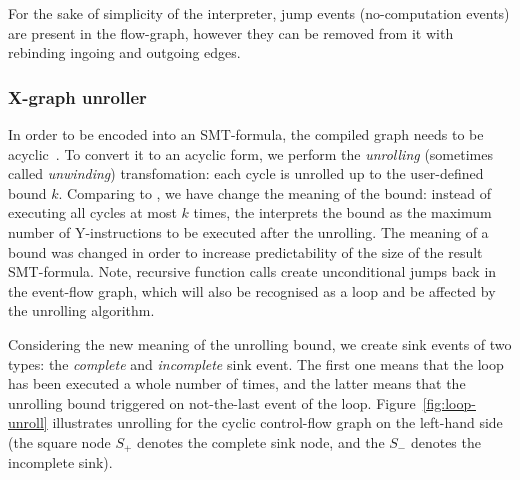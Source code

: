 
For the sake of simplicity of the interpreter, jump events (no-computation events) are present in the flow-graph, however they can be removed from it with rebinding ingoing and outgoing edges.




\subsubsection{X-graph unroller}
\label{ch:impl:proc:x-unroll}

In order to be encoded into an SMT-formula, the compiled graph needs to be acyclic~\cite{Porthos17b}.
To convert it to an acyclic form, we perform the \textit{unrolling} (sometimes called \textit{unwinding}) transfomation: each cycle is unrolled up to the user-defined bound $k$.
Comparing to \porthos[1], we have change the meaning of the bound: instead of executing all cycles at most $k$ times, the \porthos[2] interprets the bound as the maximum number of Y-instructions to be executed after the unrolling.
The meaning of a bound was changed in order to increase predictability of the size of the result SMT-formula.
Note, recursive function calls create unconditional jumps back in the event-flow graph, which will also be recognised as a loop and be affected by the unrolling algorithm.

Considering the new meaning of the unrolling bound, we create sink events of two types: the \textit{complete} and \textit{incomplete} sink event.
The first one means that the loop has been executed a whole number of times, and the latter means that the unrolling bound triggered on not-the-last event of the loop.
Figure~\ref{fig:loop-unroll} illustrates unrolling for the cyclic control-flow graph on the left-hand side (the square node $S_{+}$ denotes the complete sink node, and the $S_{-}$ denotes the incomplete sink).

